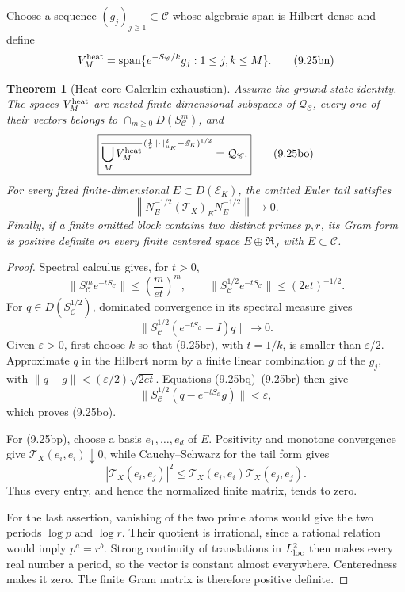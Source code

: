 \documentclass[11pt]{amsart}
\newtheorem{theorem}{Theorem}[section]
\theoremstyle{definition}
\theoremstyle{remark}
\begin{document}
Choose a sequence \((g_j)_{j\ge1}\subset\mathscr C\) whose algebraic span
is Hilbert-dense and define
\[
 V_M^{\rm heat}
 =\operatorname{span}\{e^{-S_{\mathscr C}/k}g_j:1\le j,k\le M\}.
\tag{9.25bn}
\]

\begin{theorem}[Heat-core Galerkin exhaustion]
\label{thm:heat-core}
Assume the ground-state identity.  The spaces \(V_M^{\rm heat}\) are nested finite-dimensional subspaces of
\(\mathcal Q_{\mathscr C}\), every one of their vectors belongs to
\(\cap_{m\ge0}D(S_{\mathscr C}^m)\), and
\[
 \boxed{
 \overline{\bigcup_MV_M^{\rm heat}}^{\,
 (\frac12\|\cdot\|_{\mu_K}^2+\mathscr E_K)^{1/2}}
 =\mathcal Q_{\mathscr C}.}
\tag{9.25bo}
\]
For every fixed finite-dimensional
\(E\subset D(\mathscr E_K)\), the omitted Euler tail satisfies
\[
 \boxed{
 \left\|N_E^{-1/2}(\mathcal T_X)_EN_E^{-1/2}\right\|
 \longrightarrow0.}
\tag{9.25bp}
\]
Finally, if a finite omitted block contains two distinct primes \(p,r\),
its Gram form is positive definite on every finite centered space
\(E\oplus\mathfrak R_J\) with \(E\subset\mathscr C\).
\end{theorem}

\begin{proof}
Spectral calculus gives, for \(t>0\),
\[
 \|S_{\mathscr C}^{m}e^{-tS_{\mathscr C}}\|
 \le\left(\frac{m}{et}\right)^m,
 \qquad
 \|S_{\mathscr C}^{1/2}e^{-tS_{\mathscr C}}\|
 \le(2et)^{-1/2}.
\tag{9.25bq}
\]
For \(q\in D(S_{\mathscr C}^{1/2})\), dominated convergence in its spectral
measure gives
\[
 \|S_{\mathscr C}^{1/2}(e^{-tS_{\mathscr C}}-I)q\|\longrightarrow0.
\tag{9.25br}
\]
Given \(\varepsilon>0\), first choose \(k\) so that (9.25br), with
\(t=1/k\), is smaller than \(\varepsilon/2\).  Approximate \(q\) in the
Hilbert norm by a finite linear combination \(g\) of the \(g_j\), with
\(\|q-g\|<(\varepsilon/2)\sqrt{2et}\).  Equations (9.25bq)--(9.25br)
then give
\[
 \|S_{\mathscr C}^{1/2}(q-e^{-tS_{\mathscr C}}g)\|<\varepsilon,
\]
which proves (9.25bo).

For (9.25bp), choose a basis \(e_1,\ldots,e_d\) of \(E\).  Positivity and
monotone convergence give
\(\mathcal T_X(e_i,e_i)\downarrow0\), while Cauchy--Schwarz for the tail
form gives
\[
 |\mathcal T_X(e_i,e_j)|^2
 \le\mathcal T_X(e_i,e_i)\mathcal T_X(e_j,e_j).
\]
Thus every entry, and hence the normalized finite matrix, tends to zero.

For the last assertion, vanishing of the two prime atoms would give the
two periods \(\log p\) and \(\log r\).  Their quotient is irrational,
since a rational relation would imply \(p^a=r^b\).  Strong continuity of
translations in \(L^2_{\rm loc}\) then makes every real number a period,
so the vector is constant almost everywhere.  Centeredness makes it zero.
The finite Gram matrix is therefore positive definite.
\end{proof}
\end{document}
